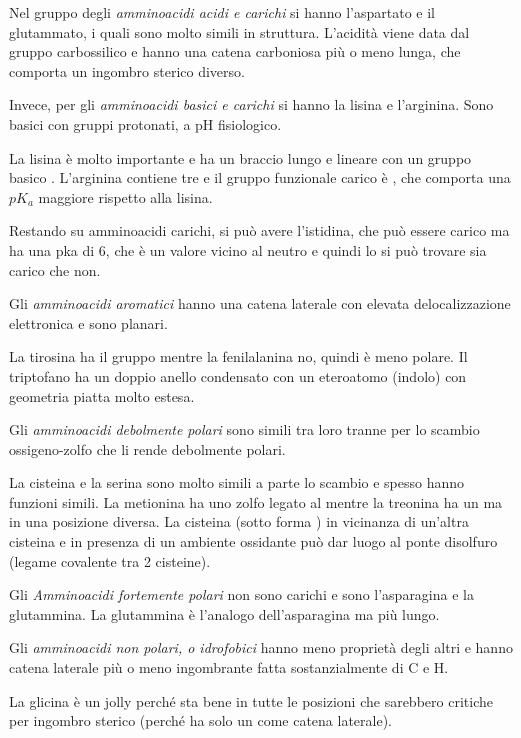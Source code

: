 Nel gruppo degli \emph{amminoacidi acidi e carichi} si hanno l'aspartato e il glutammato, i quali sono molto simili in
struttura. L'acidità viene data dal gruppo carbossilico e hanno una catena
carboniosa più o meno lunga, che comporta un ingombro sterico diverso.

Invece, per gli \emph{amminoacidi basici e carichi} si hanno la lisina e l'arginina.
Sono basici con gruppi protonati, a pH fisiologico.

La lisina è molto importante e ha un braccio lungo e lineare con un
gruppo basico .
L'arginina contiene tre  e il gruppo funzionale carico
è , che comporta una $pK_a$ maggiore
rispetto alla lisina.

Restando su amminoacidi carichi, si può avere l'istidina, che può essere
carico ma ha una pka di 6, che è un valore vicino al neutro e quindi lo
si può trovare sia carico che non.


Gli \emph{amminoacidi aromatici} hanno una catena laterale con elevata delocalizzazione
elettronica e sono planari.

La tirosina ha il gruppo  mentre la fenilalanina no, quindi è meno
polare.
Il triptofano ha un doppio anello condensato con un eteroatomo (indolo)
con geometria piatta molto estesa.

Gli \emph{amminoacidi debolmente polari} sono simili tra loro tranne per lo scambio ossigeno-zolfo che li rende
debolmente polari.

La cisteina e la serina sono molto simili a parte lo scambio e spesso
hanno funzioni simili.
La metionina ha uno zolfo legato al  mentre la
treonina ha un  ma in una posizione diversa.
La cisteina (sotto forma ) in vicinanza di un'altra cisteina e in
presenza di un ambiente ossidante può dar luogo al ponte disolfuro
(legame covalente tra 2 cisteine).

Gli \emph{Amminoacidi fortemente polari} non sono carichi e sono l'asparagina e la glutammina.
La glutammina è l'analogo dell'asparagina ma più lungo.

Gli \emph{amminoacidi non polari, o idrofobici} hanno meno proprietà degli altri e hanno catena laterale più o meno
ingombrante fatta sostanzialmente di C e H.

La glicina è un jolly perché sta bene in tutte le posizioni
che sarebbero critiche per ingombro sterico (perché ha solo un  come
catena laterale).


